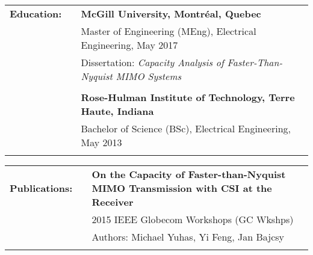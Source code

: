 \documentclass{minimal}
\begin{document}
\begin{tabular}{ p{1.5cm} p{1cm} p{16cm} }
\textbf{Education:} & & \textbf{McGill University, Montréal, Quebec} \\
& & Master of Engineering (MEng), Electrical Engineering, May 2017\\
& & Dissertation: \textit{Capacity Analysis of Faster-Than-Nyquist MIMO Systems}\\
& & \\
& & \textbf{Rose-Hulman Institute of Technology, Terre Haute, Indiana} \\
& & Bachelor of Science (BSc), Electrical Engineering, May 2013\\
& & \\
\end{tabular}

\begin{tabular}{ p{1.5cm} p{1cm} p{16cm} }
\textbf{Publications:} & & \textbf{On the Capacity of Faster-than-Nyquist MIMO Transmission with CSI at the Receiver}\\
& & 2015 IEEE Globecom Workshops (GC Wkshps)\\
& & Authors: Michael Yuhas, Yi Feng, Jan Bajcsy\\
& & \\
\end{tabular}
\end{document}
